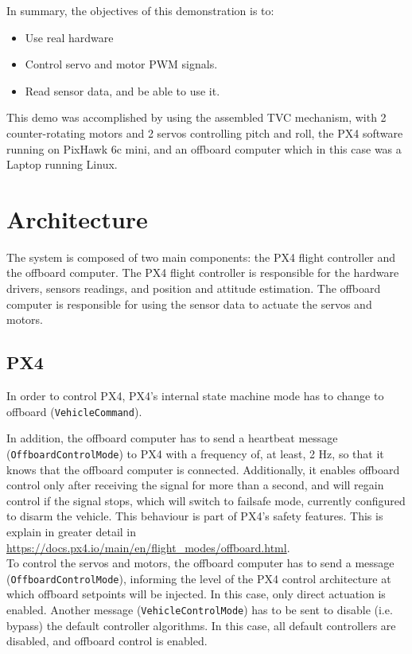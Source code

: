 \documentclass[a4paper]{article}
\begin{document}
In summary, the objectives of this demonstration is to: 

\begin{itemize}
    \item Use real hardware 
    \item Control servo and motor PWM signals. 
    \item Read sensor data, and be able to use it. 
\end{itemize}

This demo was accomplished by using the assembled TVC mechanism, with 2 counter-rotating motors and 2 servos controlling pitch and roll, the PX4 software running on PixHawk 6c mini, and an offboard computer which in this case was a Laptop running Linux. 



\clearpage
\section{Architecture}


The system is composed of two main components: the PX4 flight controller and the offboard computer. 
The PX4 flight controller is responsible for the hardware drivers, sensors readings, and position and attitude estimation. 
The offboard computer is responsible for using the sensor data to actuate the servos and motors. 

\subsection{PX4}

In order to control PX4, PX4's internal state machine mode has to change to offboard (\verb|VehicleCommand|).

In addition, the offboard computer has to send a heartbeat message (\verb|OffboardControlMode|) to PX4 with a frequency of, at least, 2 Hz, so that it knows that the offboard computer is connected. Additionally, it enables offboard control only after receiving the signal for more than a second, and will regain control if the signal stops, which will switch to failsafe mode, currently configured to disarm the vehicle. This behaviour is part of PX4's safety features. 
This is explain in greater detail in \url{https://docs.px4.io/main/en/flight_modes/offboard.html}. \\

To control the servos and motors, the offboard computer has to send a message (\verb|OffboardControlMode|), informing the level of the PX4 control architecture at which offboard setpoints will be injected. In this case, only direct actuation is enabled. 
Another message (\verb|VehicleControlMode|) has to be sent to disable (i.e. bypass) the default controller algorithms. In this case, all default controllers are disabled, and offboard control is enabled. 
\end{document}
